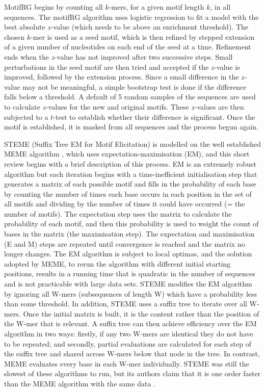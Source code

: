 \documentclass[12pt]{article}
\begin{document}
\begin{appendices}
MotifRG \citep{yao2014discriminative} begins by counting all $k$-mers, for a given motif length $k$, in all sequences. The motifRG algorithm uses logistic regression to fit a model with the best absolute $z$-value (which needs to be above an enrichment threshold). The chosen $k$-mer is used as a seed motif, which is then refined by stepped extension of a given number of nucleotides on each end of the seed at a time. Refinement ends when the $z$-value has not improved after two successive steps. Small perturbations in the seed motif are then tried and accepted if the $z$-value is improved, followed by the extension process. Since a small difference in the $z$-value may not be meaningful, a simple bootstrap test is done if the difference falls below a threshold. A default of 5 random samples of the sequences are used to calculate $z$-values for the new and original motifs. These $z$-values are then subjected to a $t$-test to establish whether their difference is significant.
Once the motif is established, it is masked from all sequences and the process begun again.

STEME (Suffix Tree EM for Motif Elicitation) \citep{reid2011steme} is modelled on the well established MEME algorithm \citep{bailey2009meme}, which uses expectation-maximisation (EM), and this short review begins with a brief description of this process. EM is an extremely robust algorithm but each iteration begins with a time-inefficient initialisation step that generates a matrix of each possible motif and fills in the probability of each base by counting the number of times each base occurs in each position in the set of all motifs and dividing by the number of times it could have occurred (= the number of motifs). The expectation step uses the matrix to calculate the probability of each motif, and then this probability is used to weight the count of bases in the matrix (the maximisation step). The expectation and maximisation (E and M) steps are repeated until convergence is reached and the matrix no longer changes. The EM algorithm is subject to local optimas, and the solution adopted by MEME, to rerun the algorithm with different initial starting positions, results in a running time that is quadratic in the number of sequences and is not practicable with large data sets. STEME modifies the EM algorithm by ignoring all W-mers (subsequences of length W) which have a probability less than some threshold. In addition, STEME uses a suffix tree to iterate over all W-mers. Once the initial matrix is built, it is the content rather than the position of the W-mer that is relevant. A suffix tree can then achieve efficiency over the EM algorithm in two ways: firstly, if any two W-mers are identical they do not have to be repeated; and secondly, partial evaluations are calculated for each step of the suffix tree and shared across W-mers below that node in the tree. In contrast, MEME evaluates every base in each W-mer individually. STEME was still the slowest of these algorithms to run, but its authors claim that it is one order faster than the MEME algorithm with the same data \citep{reid2011steme}.


\end{appendices}
\end{document}
